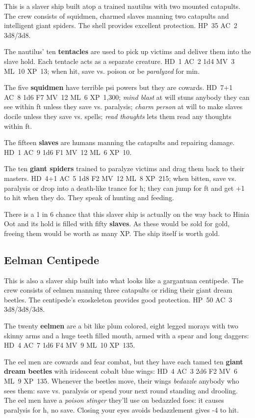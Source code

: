 \documentclass[11pt]{bxart}
\begin{document}
This is a slaver ship built atop a trained nautilus with two mounted
catapults. The crew consists of squidmen, charmed slaves manning two
catapults and intelligent giant spiders. The shell provides excellent
protection. HP~35 AC~2 3d8/3d8.

The nautilus' ten \textbf{tentacles} are used to pick up victims and
deliver them into the slave hold. Each tentacle acts as a separate
creature. HD~1 AC~2 1d4 MV~3 ML~10 XP~13; when hit, save vs. poison or
be \textit{paralyzed} for \unit[10]{min}.

The five \textbf{squidmen} have terrible psi powers but they are
cowards. HD~7+1 AC~8 1d6 F7 MV~12 ML~6 XP~1,300; \textit{mind blast}
at will stuns anybody they can see within \unit[60]{ft} unless they
save vs. paralysis; \textit{charm person} at will to make slaves
docile unless they save vs. spells; \textit{read thoughts} lets them
read any thoughts within \unit[60]{ft}.

The fifteen \textbf{slaves} are humans manning the catapults and
repairing damage. HD~1 AC~9 1d6 F1 MV~12 ML~6 XP~10.

The ten \textbf{giant spiders} trained to paralyze victims and drag
them back to their masters. HD~4+1 AC~5 1d8 F2 MV~12 ML~8 XP~215; when
bitten, save vs. paralysis or drop into a death-like trance for
\unit[6]{h}; they can jump for \unit[20]{ft} and get +1 to hit when
they do. They speak of hunting and feeding.

There is a 1 in 6 chance that this slaver ship is actually on the way
back to Hinia Oot and its hold is filled with fifty \textbf{slaves}.
As these would be sold for \unit[25,000]{gold}, freeing them would be
worth as many XP. The ship itself is worth \unit[35,000]{gold}.

\subsection{Eelman Centipede}

This is also a slaver ship built into what looks like a gargantuan
centipede. The crew consists of eelmen manning three catapults or
riding their giant dream beetles. The centipede's exoskeleton provides
good protection. HP~50 AC~3 3d8/3d8/3d8.

The twenty \textbf{eelmen} are a bit like plum colored, eight legged
morays with two skinny arms and a huge teeth filled mouth, armed with
a spear and long daggers: HD~4 AC~7 1d6 F4 MV~9 ML~10 XP~135.

The eel men are cowards and fear combat, but they have each tamed ten
\textbf{giant dream beetles} with iridescent cobalt blue wings: HD~4
AC~3 2d6 F2 MV~6 ML~9 XP~135. Whenever the beetles move, their wings
\textit{bedazzle} anybody who sees them: save vs. paralysis or spend
your next round standing and drooling. The eel men have a
\textit{poison stinger} they'll use on bedazzled foes: it causes
paralysis for \unit[1]{h}, no save. Closing your eyes avoids
bedazzlement gives -4 to hit.
\end{document}
